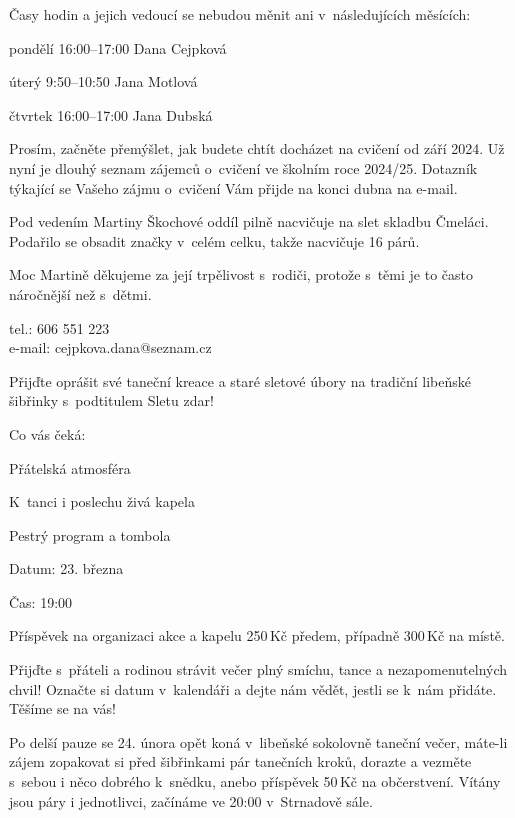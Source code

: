 \documentclass[11pt]{article}
\begin{document}
Časy hodin a jejich vedoucí se nebudou měnit ani v~následujících měsících:

\vspace*{6pt}
pondělí 16:00–17:00 Dana Cejpková

úterý 9:50–10:50 Jana Motlová

čtvrtek 16:00–17:00 Jana Dubská
\vspace*{6pt}

Prosím, začněte přemýšlet, jak budete chtít docházet na cvičení od září 2024. Už nyní je dlouhý seznam zájemců o~cvičení ve školním roce 2024/25. Dotazník týkající se Vašeho zájmu o~cvičení Vám přijde na konci dubna na e-mail.

Pod vedením Martiny Škochové oddíl pilně nacvičuje na slet skladbu Čmeláci. Podařilo se obsadit značky v~celém celku, takže nacvičuje 16 párů. 

Moc Martině děkujeme za její trpělivost s~rodiči, protože s~těmi je to často náročnější než s~dětmi.

\signature{Dana Cejpková}{tel.: 606 551 223\\e-mail: cejpkova.dana@seznam.cz}

\clearpage



Přijďte oprášit své taneční kreace a staré sletové úbory na tradiční libeňské šibřinky s~podtitulem Sletu zdar!

\noindent
Co vás čeká:

Přátelská atmosféra 

K~tanci i poslechu živá kapela 

Pestrý program a tombola

\noindent Datum: 23. března

\noindent Čas: 19:00 

Příspěvek na organizaci akce a kapelu 250\,Kč předem, případně 300\,Kč na místě.

Přijďte s~přáteli a rodinou strávit večer plný smíchu, tance a nezapomenutelných chvil! Označte si datum v~kalendáři a dejte nám vědět, jestli se k~nám přidáte. Těšíme se na vás!

\vspace*{24pt}

Po delší pauze se 24. února opět koná v~libeňské sokolovně taneční večer, máte-li zájem zopakovat si před šibřinkami pár tanečních kroků, dorazte a vezměte s~sebou i něco dobrého k~snědku, anebo příspěvek 50\,Kč na občerstvení. Vítány jsou páry i jednotlivci, začínáme ve 20:00 v~Strnadově sále.
\end{document}
